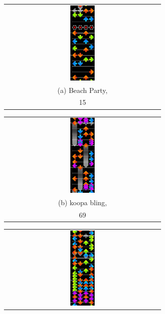 \documentclass[10pt]{sigplanconf}
\begin{document}
\begin{figure}[t]
	\begin{center}
	\begin{tabular}{c}
		\includegraphics[width=0.16\textwidth]{disco-beachparty.png}
		\\
		(a) Beach Party, \\ 15 \cite{beachparty} %
	\end{tabular}
	\begin{tabular}{c}
		\includegraphics[width=0.16\textwidth]{disco-koopa.png}
		\\
		(b) koopa bling, \\ 69 \cite{koopa} %
	\end{tabular}
	\begin{tabular}{c}
		\includegraphics[width=0.16\textwidth]{disco-zombiesunet.png}

\end{tabular}
\end{center}
\end{figure}
\end{document}
